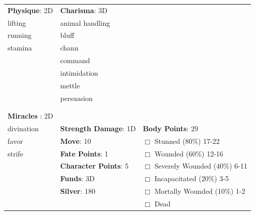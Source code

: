 \documentclass[10pt]{article}
\begin{document}
\begin{table}
\begin{tabular}{m{156pt} m{156pt} m{156pt}}
\textbf{Physique}: 2D \hrulefill & \textbf{Charisma}: 3D \hrulefill     &  \hrulefill \\

lifting              \hrulefill & animal handling      \hrulefill &  \hrulefill \\

running              \hrulefill & bluff                \hrulefill &  \hrulefill \\

stamina              \hrulefill & chann                \hrulefill &  \hrulefill \\

 \hrulefill & command              \hrulefill &  \hrulefill \\

 \hrulefill & intimidation         \hrulefill &  \hrulefill \\

 \hrulefill & mettle               \hrulefill &  \hrulefill \\

 \hrulefill & persuasion           \hrulefill &  \hrulefill \\

 \hrulefill &  \hrulefill &  \hrulefill \\

                                  &                                 &                             \\
\textbf{Miracles }: 2D \hrulefill  &                                 &                             \\
divination           \hrulefill & \textbf{Strength Damage}: 1D \hrulefill                             & \textbf{Body Points}: 29 \hrulefill \\
favor                \hrulefill                        & \textbf{Move}:             10             \hrulefill    & $\Box$ Stunned \footnotesize{(80\%)} \hfill 17-22 \\
strife               \hrulefill                        & \textbf{Fate Points}:      1      \hrulefill    & $\Box$ Wounded \footnotesize{(60\%)} \hfill 12-16 \\
 \hrulefill                        & \textbf{Character Points}: 5 \hrulefill    & $\Box$ Severely Wounded \footnotesize{(40\%)} \hfill 6-11 \\
 \hrulefill                        & \textbf{Funds}:            3D            \hrulefill    & $\Box$ Incapacitated \footnotesize{(20\%)} \hfill 3-5 \\
 \hrulefill                        & \textbf{Silver}:           180           \hrulefill    & $\Box$ Mortally Wounded \footnotesize{(10\%)} \hfill 1-2 \\
 \hrulefill                        &  \hrulefill                                                       & $\Box$ Dead   \\
\end{tabular}
\end{table}
\end{document}
